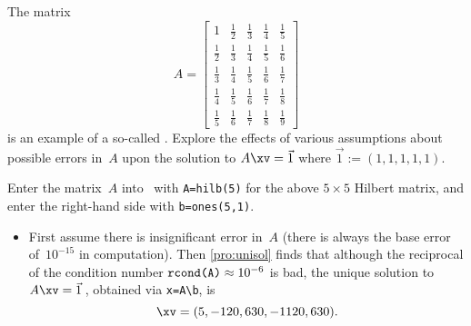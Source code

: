 \begin{example} \label{eg:hilb5}
The matrix 
\begin{equation*}
A=\begin{bmatrix} 1&\frac12&\frac13&\frac14&\frac15
\\\frac12&\frac13&\frac14&\frac15&\frac16
\\\frac13&\frac14&\frac15&\frac16&\frac17
\\\frac14&\frac15&\frac16&\frac17&\frac18
\\\frac15&\frac16&\frac17&\frac18&\frac19
\end{bmatrix}
\end{equation*}
is an example of a so-called .
Explore the effects of various assumptions about possible errors in~\(A\) upon the solution to \(A\xv=\vec 1\) where \(\vec1:=(1,1,1,1,1)\).
\begin{solution} 
Enter the matrix~\(A\) into \script\ with \verb|A=hilb(5)| for the above \(5\times5\) Hilbert matrix, and enter the right-hand side with \verb|b=ones(5,1)|.
\begin{itemize}
\item First assume there is insignificant error in~\(A\) (there is always the base error of~\(10^{-15}\) in computation).
Then \autoref{pro:unisol} finds that although the reciprocal of the condition number \(\verb|rcond(A)|\approx10^{-6}\) is bad, the unique solution to \(A\xv=\vec1\)\,, obtained via \verb|x=A\b|, is
\begin{equation*}
\xv=(5,-120,630,-1120,630).
\end{equation*}
 
\setbox\ajrqrbox\hbox{}%
\marginpar{\usebox{\ajrqrbox\\[2ex]}}%


\end{itemize}
\end{solution}
\end{example}
